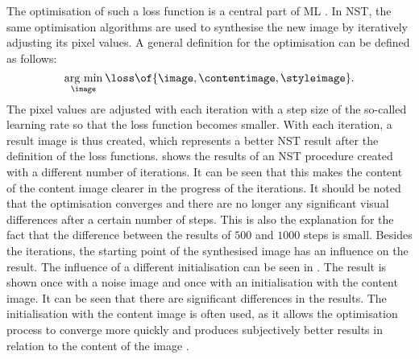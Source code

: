 The optimisation of such a loss function \loss{} is a central part of \gls{ML} \cite{Alp2020}. In \gls{NST}, the same optimisation algorithms are used to synthesise the new image \image{} by iteratively adjusting its pixel values. A general definition for the optimisation can be defined as follows:
\begin{equation*}
	\argmin{\image}{\loss\of{\image\eqcommasep \contentimage\eqcommasep \styleimage}} \eqtextdot
\end{equation*} 
The pixel values are adjusted with each iteration with a step size of the so-called learning rate so that the loss function becomes smaller. With each iteration, a result image is thus created, which represents a better \gls{NST} result after the definition of the loss functions.  shows the results of an \gls{NST} procedure created with a different number of iterations. It can be seen that this makes the content of the content image clearer in the progress of the iterations. It should be noted that the optimisation converges and there are no longer any significant visual differences after a certain number of steps. This is also the explanation for the fact that the difference between the results of $500$ and $1000$ steps is small. Besides the iterations, the starting point of the synthesised image \image{} has an influence on the result. The influence of a different initialisation can be seen in . The result is shown once with a noise image and once with an initialisation with the content image. It can be seen that there are significant differences in the results. The initialisation with the content image is often used, as it allows the optimisation process to converge more quickly and produces subjectively better results in relation to the content of the image \cite{TODO}.
